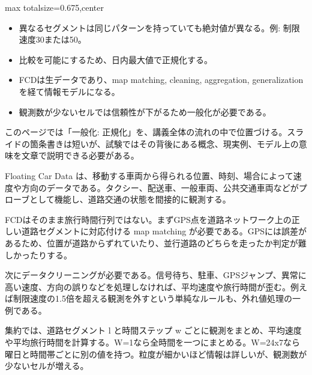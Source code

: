 \clearpage
{}
\begin{adjustbox}{max totalsize={\textwidth}{0.675\textheight},center}
\begin{minipage}{\textwidth}\scriptsize
\begin{minipage}[t]{0.485\textwidth}
\begin{itemize}
\item 異なるセグメントは同じパターンを持っていても絶対値が異なる。例: 制限速度30または50。
\item 比較を可能にするため、日内最大値で正規化する。
\end{itemize}
\begin{itemize}
\item FCDは生データであり、map matching, cleaning, aggregation, generalization を経て情報モデルになる。
\item 観測数が少ないセルでは信頼性が下がるため一般化が必要である。
\end{itemize}
\end{minipage}\hfill
\begin{minipage}[t]{0.485\textwidth}
このページでは「一般化: 正規化」を、講義全体の流れの中で位置づける。スライドの箇条書きは短いが、試験ではその背後にある概念、現実例、モデル上の意味を文章で説明できる必要がある。\par
Floating Car Data は、移動する車両から得られる位置、時刻、場合によって速度や方向のデータである。タクシー、配送車、一般車両、公共交通車両などがプローブとして機能し、道路交通の状態を間接的に観測する。\par
FCDはそのまま旅行時間行列ではない。まずGPS点を道路ネットワーク上の正しい道路セグメントに対応付ける map matching が必要である。GPSには誤差があるため、位置が道路からずれていたり、並行道路のどちらを走ったか判定が難しかったりする。\par
次にデータクリーニングが必要である。信号待ち、駐車、GPSジャンプ、異常に高い速度、方向の誤りなどを処理しなければ、平均速度や旅行時間が歪む。例えば制限速度の1.5倍を超える観測を外すという単純なルールも、外れ値処理の一例である。\par
集約では、道路セグメント l と時間ステップ w ごとに観測をまとめ、平均速度や平均旅行時間を計算する。W=1なら全時間を一つにまとめる。W=24x7なら曜日と時間帯ごとに別の値を持つ。粒度が細かいほど情報は詳しいが、観測数が少ないセルが増える。\par

\end{minipage}
\end{minipage}
\end{adjustbox}
